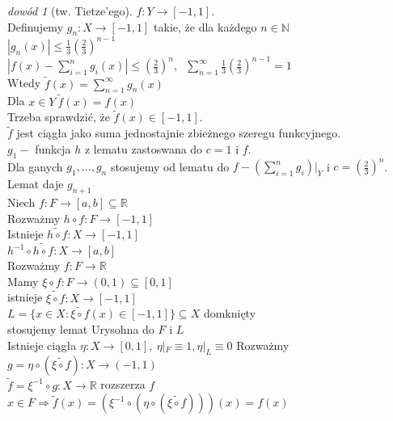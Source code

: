 \documentclass[twoside,10pt]{article}
\theoremstyle{definition}
\theoremstyle{definition}
\theoremstyle{definition}
\theoremstyle{definition}
\theoremstyle{remark}
\newtheorem*{dd}{dowód}
\theoremstyle{definition}
\theoremstyle{definition}
\theoremstyle{definition}
\theoremstyle{definition}
\theoremstyle{definition}
\theoremstyle{definition}
\begin{document}
\begin{dd}[tw. Tietze'ego]
    $f : Y \to [-1,1]$.\\ 
    Definujemy $g_n: X \to [-1,1]$ takie, że dla każdego $n \in \mathbb N$ \\
    $|g_n (x) | \le \frac{1}{3} (\frac{2}{3})^{n-1}$ \\ 
    $|f(x) - \sum\limits_{i = 1}^n g_i (x)| \le (\frac{2}{3})^n, \ $
    $\sum\limits_{n=1}^\infty \frac{1}{3} (\frac{2}{3})^{n-1} = 1$ \\ 
    Wtedy $\widetilde f(x) = \sum\limits_{n=1}^\infty g_n(x)$ \\ 
    Dla $x \in Y \ \widetilde f(x) = f(x)$ \\ 
    Trzeba sprawdzić, że $\widetilde f(x) \in [-1,1]$. \\ 
    $\widetilde f$ jest ciągła jako suma jednostajnie zbieżnego szeregu funkcyjnego. \\ 
    $g_1 - $ funkcja $h$ z lematu zastoswana do $c = 1$ i $f$. \\ 
    Dla ganych $g_1,\ldots,g_n$ stosujemy od lematu do $f-(\sum\limits_{i=1}^n g_i)|_Y$ i $c = (\frac{2}{3})^n$.
    Lemat daje $g_{n+1}$ \\ 
    Niech $ f: F \to [a,b] \subseteq \mathbb R $ \\
    Rozważmy $h \circ f: F \to [-1,1]$ \\ 
    Istnieje $\widetilde{h \circ f}: X \to [-1,1]$ \\ 
    $h^{-1} \circ \widetilde{h \circ f}: X \to [a,b]$ \\ 
    Rozważmy $f: F \to \mathbb R$ \\ 
    Mamy $\xi \circ f: F \to (0,1) \subseteq [0,1]$ \\ 
    istnieje $\widetilde{\xi \circ f} : X \to [-1,1]$ \\ 
    $L = \{ x \in X: \widetilde{\xi \circ f} (x) \in [-1,1] \} \subseteq X$ domknięty \\ 
    stosujemy lemat Urysohna do $F$ i $L$  \\ 
    Istnieje ciągła $\eta: X \to [0,1],\ \eta |_F \equiv 1, \eta |_L \equiv 0$
    Rozważmy $g = \eta \circ (\widetilde{\xi \circ f}) : X \to (-1,1)$ \\ 
    $\widetilde f = \xi^{-1} \circ g : X \to \mathbb R$ rozszerza $f$ \\ 
    $x \in F \Rightarrow \widetilde f (x) = (\xi ^{-1} \circ (\eta \circ (\widetilde{
    \xi \circ f})))(x) = f(x)$ 
\end{dd} 
\end{document}
